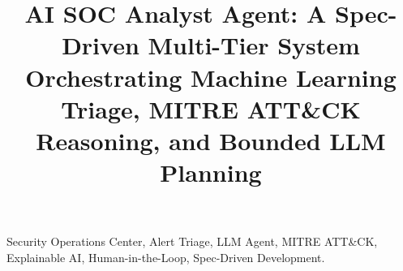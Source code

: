 \documentclass[conference]{IEEEtran}
\begin{document}
\title{AI SOC Analyst Agent: A Spec-Driven Multi-Tier System Orchestrating
Machine Learning Triage, MITRE ATT\&CK Reasoning, and Bounded LLM Planning}

\author{%
}

\maketitle

\begin{abstract}

\end{abstract}

\begin{IEEEkeywords}
Security Operations Center, Alert Triage, LLM Agent, MITRE ATT\&CK,
Explainable AI, Human-in-the-Loop, Spec-Driven Development.
\end{IEEEkeywords}












\end{document}
